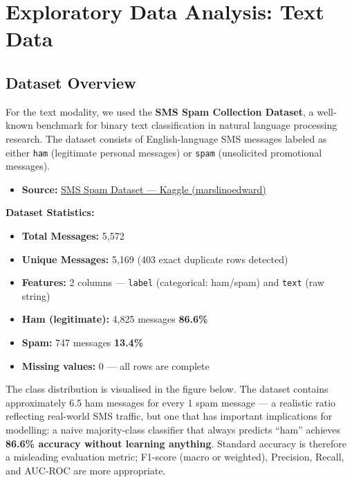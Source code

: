 \section{Exploratory Data Analysis: Text Data}
\label{sec:text}

\subsection{Dataset Overview}
For the text modality, we used the \textbf{SMS Spam Collection Dataset}, a well-known benchmark for binary text classification in natural language processing research. The dataset consists of English-language SMS messages labeled as either \texttt{ham} (legitimate personal messages) or \texttt{spam} (unsolicited promotional messages).

\begin{itemize}
    \item \textbf{Source:} \href{https://www.kaggle.com/datasets/marslinoedward/sms-spam-dataset/data}{SMS Spam Dataset --- Kaggle (marslinoedward)}
\end{itemize}

\begin{importantbox}
\textbf{Dataset Statistics:}
\begin{itemize}
    \item \textbf{Total Messages:} 5{,}572
    \item \textbf{Unique Messages:} 5{,}169 \hfill (403 exact duplicate rows detected)
    \item \textbf{Features:} 2 columns --- \texttt{label} (categorical: ham/spam) and \texttt{text} (raw string)
    \item \textbf{Ham (legitimate):} 4{,}825 messages \quad \textbf{86.6\%}
    \item \textbf{Spam:} 747 messages \quad \textbf{13.4\%}
    \item \textbf{Missing values:} 0 --- all rows are complete
\end{itemize}
\end{importantbox}

The class distribution is visualised in the figure below. The dataset contains approximately 6.5 ham messages for every 1 spam message --- a realistic ratio reflecting real-world SMS traffic, but one that has important implications for modelling: a naive majority-class classifier that always predicts ``ham'' achieves \textbf{86.6\% accuracy without learning anything}. Standard accuracy is therefore a misleading evaluation metric; F1-score (macro or weighted), Precision, Recall, and AUC-ROC are more appropriate.

